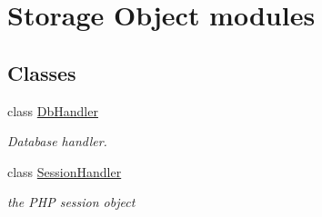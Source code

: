 \hypertarget{group__OWL__SO__LAYER}{
\section{Storage Object modules}
\label{group__OWL__SO__LAYER}
}
\subsection*{Classes}
\begin{CompactItemize}
\item 
class \hyperlink{classDbHandler}{DbHandler}
\begin{CompactList}\small\item\em Database handler. \item\end{CompactList}\item 
class \hyperlink{classSessionHandler}{SessionHandler}
\begin{CompactList}\small\item\em the PHP session object \item\end{CompactList}\end{CompactItemize}

